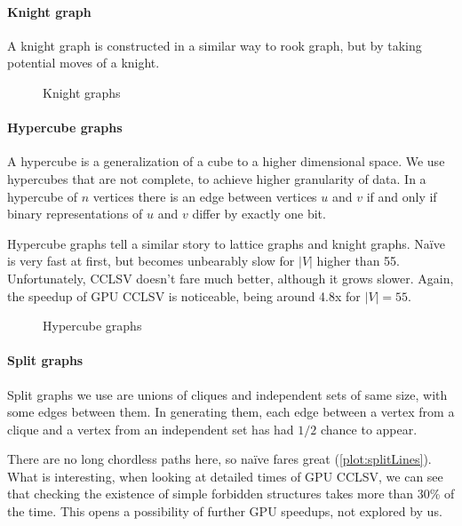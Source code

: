 \paragraph{Knight graph}

A knight graph is constructed in a similar way to rook graph, but by taking potential moves of a knight.


\begin{figure}
  \centering
  
  \label{plot:knightLines}
  \caption{Knight graphs}
\end{figure}

\paragraph{Hypercube graphs}

A hypercube is a generalization of a cube to a higher dimensional space. We use hypercubes that are not complete, to achieve higher granularity of data. In a hypercube of $n$ vertices there is an edge between vertices $u$ and $v$ if and only if binary representations of $u$ and $v$ differ by exactly one bit.

Hypercube graphs tell a similar story to lattice graphs and knight graphs. Na\"ive is very fast at first, but becomes unbearably slow for $|V|$ higher than 55. Unfortunately, CCLSV doesn't fare much better, although it grows slower. Again, the speedup of GPU CCLSV is noticeable, being around 4.8x for $|V| = 55$.

\begin{figure}
  \centering
  
  \label{plot:hypercubeLines}
  \caption{Hypercube graphs}
\end{figure}

\paragraph{Split graphs}

Split graphs we use are unions of cliques and independent sets of same size, with some edges between them. In generating them, each edge between a vertex from a clique and a vertex from an independent set has had $1/2$ chance to appear.

There are no long chordless paths here, so na\"ive fares great (\cref{plot:splitLines}). What is interesting, when looking at detailed times of GPU CCLSV, we can see that checking the existence of simple forbidden structures takes more than 30\% of the time. This opens a possibility of further GPU speedups, not explored by us.

